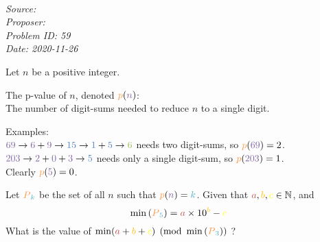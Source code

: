 \SSbreak\\
\emph{Source: \Cop}\\
\emph{Proposer: \Pkee}\\
\emph{Problem ID: 59}\\
\emph{Date: 2020-11-26}\\
\SSbreak

\begin{mdframed}[backgroundcolor=pagegray,rightline=false,leftline=false, topline=false, bottomline=false]
    \color{white}
    Let \textcolor{qpurple}{$n$} be a positive integer.
    \par
    The \textcolor{qlorange}{p-value} of \textcolor{qpurple}{$n$}, denoted $\persistk{n}$: \\

    The number of digit-sums needed to reduce \textcolor{qpurple}{$n$} to a single digit.
    \par
    Examples: \\

    $\textcolor{qpurple}{69} \rightarrow \textcolor{qpurple}{6} + \textcolor{qpurple}{9} \rightarrow \textcolor{qblue}{15} \rightarrow \textcolor{qblue}{1} + \textcolor{qblue}{5} \rightarrow \textcolor{qgreen}{6}$ needs two digit-sums, so $\persistk{69} = 2$. \\
    $\textcolor{qpurple}{203} \rightarrow \textcolor{qpurple}{2} + \textcolor{qpurple}{0} +  \textcolor{qpurple}{3} \rightarrow \textcolor{qblue}{5}$ needs only a single digit-sum, so $\persistk{203} = 1$. \\
    Clearly $\persistk{5} = 0$.\\

    \par
    Let $\persistsetk{k}$ be the set of all \textcolor{qpurple}{$n$} such that $\persistk{n} = \textcolor{qlblue}{k}$. Given that $\textcolor{qred}{a}, \textcolor{qorange}{b}, \textcolor{qyellow}{c} \in \mathbb{N}$, and
    \begin{equation*}
        \min{(\persistsetk{5})} = \textcolor{qred}{a}\times 10^{\textcolor{qorange}{b}} - \textcolor{qyellow}{c}
    \end{equation*}
    What is the value of $\min(\textcolor{qred}{a} + \textcolor{qorange}{b} + \textcolor{qyellow}{c}) \pmod{\min{(\persistsetk{3})}}$ ?
\end{mdframed}
\color{black}
\bigskip

\begin{solution}
    
\end{solution}